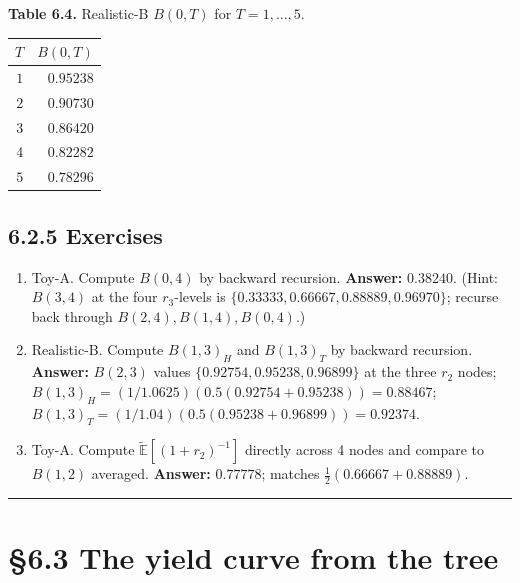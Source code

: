 \documentclass[
  10pt,
  twoside]{book}
\newcounter{none} %
\providecommand{\tightlist}{%
  \setlength{\itemsep}{0pt}\setlength{\parskip}{0pt}}
\begin{document}
\textbf{Table 6.4.} Realistic-B \(B(0, T)\) for \(T = 1, \ldots, 5\).

{\def\LTcaptype{none} %
\begin{table}[H]
\centering
\begin{tabular}{|r|r|}
\toprule
\(T\) & \(B(0, T)\) \\
\midrule



\(1\) & \(0.95238\) \\
\(2\) & \(0.90730\) \\
\(3\) & \(0.86420\) \\
\(4\) & \(0.82282\) \\
\(5\) & \(0.78296\) \\
\bottomrule
\end{tabular}
\end{table}
}

\subsection{6.2.5 Exercises}\label{exercises-28}

\begin{enumerate}
\def\labelenumi{\arabic{enumi}.}
\tightlist
\item
  Toy-A. Compute \(B(0, 4)\) by backward recursion. \textbf{Answer:}
  \(0.38240\). (Hint: \(B(3,4)\) at the four \(r_3\)-levels is
  \(\{0.33333, 0.66667, 0.88889, 0.96970\}\); recurse back through
  \(B(2,4), B(1,4), B(0,4)\).)
\item
  Realistic-B. Compute \(B(1, 3)_H\) and \(B(1, 3)_T\) by backward
  recursion. \textbf{Answer:} \(B(2,3)\) values
  \(\{0.92754, 0.95238, 0.96899\}\) at the three \(r_2\) nodes;
  \(B(1,3)_H = (1/1.0625)(0.5(0.92754+0.95238)) = 0.88467\);
  \(B(1,3)_T = (1/1.04)(0.5(0.95238+0.96899)) = 0.92374\).
\item
  Toy-A. Compute \(\tilde{\mathbb E}[(1 + r_2)^{-1}]\) directly across 4
  nodes and compare to \(B(1, 2)\) averaged. \textbf{Answer:}
  \(0.77778\); matches \(\tfrac{1}{2}(0.66667 + 0.88889)\).
\end{enumerate}

\begin{center}\rule{0.5\linewidth}{0.5pt}\end{center}

\section{§6.3 The yield curve from the
tree}\label{the-yield-curve-from-the-tree}
\end{document}
